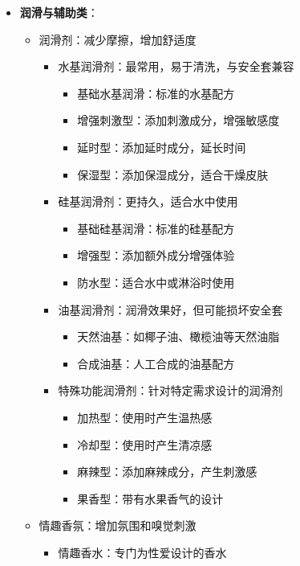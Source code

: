 \documentclass[12pt,UTF8]{ctexbook}
\begin{document}
\begin{itemize}
\begin{itemize}
\begin{itemize}
\begin{itemize}
				\item 温度按摩油：可加热的按摩油
			\end{itemize}
		\end{itemize}
	\end{itemize}
	\item \textbf{润滑与辅助类}：
	\begin{itemize}
		\item 润滑剂：减少摩擦，增加舒适度
		\begin{itemize}
			\item 水基润滑剂：最常用，易于清洗，与安全套兼容
			\begin{itemize}
				\item 基础水基润滑：标准的水基配方
				\item 增强刺激型：添加刺激成分，增强敏感度
				\item 延时型：添加延时成分，延长时间
				\item 保湿型：添加保湿成分，适合干燥皮肤
			\end{itemize}
			\item 硅基润滑剂：更持久，适合水中使用
			\begin{itemize}
				\item 基础硅基润滑：标准的硅基配方
				\item 增强型：添加额外成分增强体验
				\item 防水型：适合水中或淋浴时使用
			\end{itemize}
			\item 油基润滑剂：润滑效果好，但可能损坏安全套
			\begin{itemize}
				\item 天然油基：如椰子油、橄榄油等天然油脂
				\item 合成油基：人工合成的油基配方
			\end{itemize}
			\item 特殊功能润滑剂：针对特定需求设计的润滑剂
			\begin{itemize}
				\item 加热型：使用时产生温热感
				\item 冷却型：使用时产生清凉感
				\item 麻辣型：添加麻辣成分，产生刺激感
				\item 果香型：带有水果香气的设计
			\end{itemize}
		\end{itemize}
		\item 情趣香氛：增加氛围和嗅觉刺激
		\begin{itemize}
			\item 情趣香水：专门为性爱设计的香水

\end{itemize}
\end{itemize}
\end{itemize}
\end{document}
